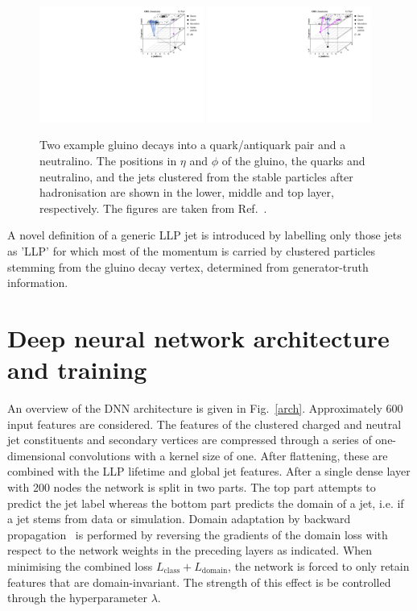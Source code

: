 \documentclass{webofc}
\begin{document}
\begin{figure}[!ht]
\includegraphics[width=0.48\textwidth]{figs/decay1.pdf}\hspace{0.03\textwidth}
\includegraphics[width=0.48\textwidth]{figs/decay2.pdf}
\centering
\caption{Two example gluino decays into a quark/antiquark pair and a neutralino. The positions in $\eta$ and $\phi$ of the gluino, the quarks and neutralino, and the jets clustered from the stable particles after hadronisation are shown in the lower, middle and top layer, respectively. The figures are taken from Ref.~\cite{CMS-EXO-19-011}.}
\label{decay}
\end{figure}

A novel definition of a generic LLP jet is introduced by labelling only those jets as 'LLP' for which most of the momentum is carried by clustered particles stemming from the gluino decay vertex, determined from generator-truth information.


\section{Deep neural network architecture and training}
\label{dnn}

An overview of the DNN architecture is given in Fig.~\ref{arch}. Approximately 600 input features are considered. The features of the clustered charged and neutral jet constituents and secondary vertices are compressed through a series of one-dimensional convolutions with a kernel size of one. After flattening, these are combined with the LLP lifetime and global jet features. After a single dense layer with 200 nodes the network is split in two parts. The top part attempts to predict the jet label whereas the bottom part predicts the domain of a jet, i.e. if a jet stems from data or simulation. Domain adaptation by backward propagation~\cite{da} is performed by reversing the gradients of the domain loss with respect to the network weights in the preceding layers as indicated. When minimising the combined loss $L_\mathrm{class}+L_\mathrm{domain}$, the network is forced to only retain features that are domain-invariant. The strength of this effect is be controlled through the hyperparameter $\lambda$.
\end{document}
